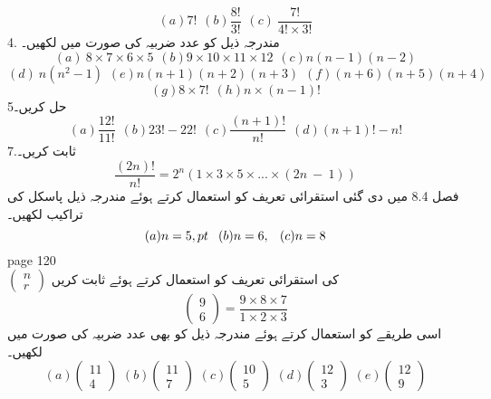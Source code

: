\[(a) 7! \hspace{5pt}  (b)\frac{8!}{3!}  \hspace{5pt}  (c)\ \frac{7!}{4! \times 3!} \]
4.
مندرجہ ذیل کو عدد ضربیہ کی صورت میں لکھیں۔\\
\[(a)\ 8\times 7\times 6\times 5 \hspace{5pt} (b)9\times 10\times 11\times 12 \hspace{5pt} (c) n(n-1)(n-2)\]
\[(d)\ n(n^{2} -1) \hspace{5pt} (e) n(n + 1)(n + 2)(n + 3) \hspace{5pt} (f)(n+6)(n+5)(n+4)\]
\[(g) 8\times 7! \hspace{5pt} (h)n\times  (n -1)!\]
5حل کریں۔\\
\[(a) \frac{12!}{11!} \hspace{5pt} (b)23! - 22! \hspace{5pt} (c) \frac{(n+1)!}{n!} \hspace{5pt} (d) (n + 1)! - n! \]
7.ثابت کریں۔\\
\[\frac{(2n)!}{n!}  = 2^{n}(1\times 3\times 5\times ... \times (2n\ -\ 1))\]
فصل 8.4 میں دی گئی استقرائی تعریف کو استعمال کرتے ہوئے مندرجہ ذیل پاسکل کی تراکیب لکھیں۔\\
\[(a) n = 5,\hspace{8ptpt} (b)n = 6, \hspace{8pt} (c)n = 8\]
\clearpage
page 120\\
\( \begin{pmatrix}n \\ r \end{pmatrix}   \)
کی استقرائی تعریف کو استعمال کرتے ہوئے ثابت کریں\\
\[\begin{pmatrix} 9 \\6\end{pmatrix} =\frac{9\times 8\times 7}{1\times 2\times 3}\]
اسی طریقے کو استعمال کرتے ہوئے مندرجہ ذیل کو بھی عدد ضربیہ کی صورت میں لکھیں۔\\
\[(a) \begin{pmatrix}11 \\ 4\end{pmatrix} \hspace{4pt}
(b) \begin{pmatrix}11 \\ 7\end{pmatrix}  \hspace{4pt}
(c) \begin{pmatrix}10 \\ 5 \end{pmatrix} \hspace{4pt}
(d) \begin{pmatrix}12 \\ 3\end{pmatrix} \hspace{4pt} 
(e) \begin{pmatrix}12 \\ 9 \end{pmatrix} \]
